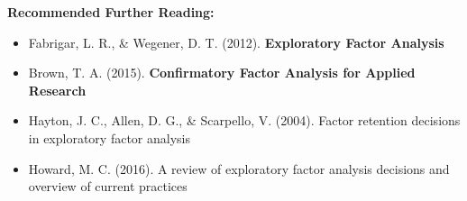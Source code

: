 \documentclass[
]{article}
\begin{document}
\textbf{Recommended Further Reading:}

\begin{itemize}
\item
  Fabrigar, L. R., \& Wegener, D. T. (2012). \textbf{Exploratory Factor
  Analysis}
\item
  Brown, T. A. (2015). \textbf{Confirmatory Factor Analysis for Applied
  Research}
\item
  Hayton, J. C., Allen, D. G., \& Scarpello, V. (2004). Factor retention
  decisions in exploratory factor analysis
\item
  Howard, M. C. (2016). A review of exploratory factor analysis
  decisions and overview of current practices
\end{itemize}
\end{document}
